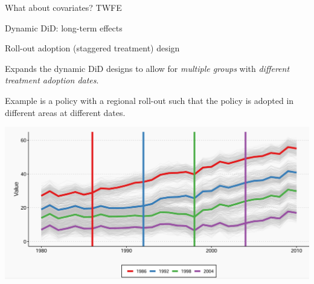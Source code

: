 \documentclass[notes,11pt, aspectratio=169]{beamer}
\newenvironment{wideitemize}{\itemize\addtolength{\itemsep}{10pt}}{\enditemize}
\begin{document}
\begin{frame}{What about covariates?}
    TWFE
\end{frame}

\begin{frame}{Dynamic DiD: long-term effects}
    
\end{frame}


\begin{frame}{Roll-out adoption (staggered treatment) design}
      \begin{wideitemize}
          \item Expands the dynamic DiD designs to allow for \textit{multiple groups} with \textit{different treatment adoption dates}. \item Example is a policy with a regional roll-out such that the policy is adopted in different areas at different dates.
\vspace{1cm}
    \begin{center}
        \includegraphics[width=0.6\linewidth]{StaggeredRollout.png}
    \end{center}
          
      \end{wideitemize}
\end{frame}
\end{document}
